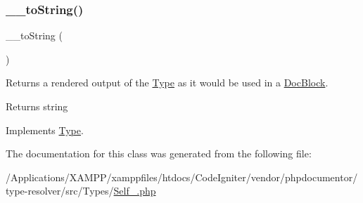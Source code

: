 \subsubsection{\texorpdfstring{\+\_\+\+\_\+to\+String()}{\_\_toString()}}
{\footnotesize\ttfamily \+\_\+\+\_\+to\+String (\begin{DoxyParamCaption}{ }\end{DoxyParamCaption})}

Returns a rendered output of the \mbox{\hyperlink{interfacephp_documentor_1_1_reflection_1_1_type}{Type}} as it would be used in a \mbox{\hyperlink{classphp_documentor_1_1_reflection_1_1_doc_block}{Doc\+Block}}.

\begin{DoxyReturn}{Returns}
string 
\end{DoxyReturn}


Implements \mbox{\hyperlink{interfacephp_documentor_1_1_reflection_1_1_type_a7516ca30af0db3cdbf9a7739b48ce91d}{Type}}.



The documentation for this class was generated from the following file\+:\begin{DoxyCompactItemize}
\item 
/\+Applications/\+X\+A\+M\+P\+P/xamppfiles/htdocs/\+Code\+Igniter/vendor/phpdocumentor/type-\/resolver/src/\+Types/\mbox{\hyperlink{_self___8php}{Self\+\_\+.\+php}}\end{DoxyCompactItemize}
